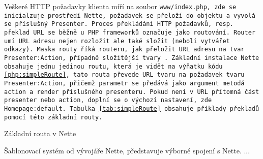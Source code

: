  \label{section:routovani}
Veškeré HTTP požadavky klienta míří na soubor \tt{www/index.php}, zde se inicialzuje prostředí Nette, požadavek se přeloží do objektu  a vyvolá se příslušný Presenter. Proces překládání HTTP požadavků, resp. překlad URL se běžně u PHP frameworků označuje jako routování. Router umí URL adresu nejen rozložit ale také složit (neboli vytvářet odkazy). Maska routy říká routeru, jak přeložit URL adresu na tvar \texttt{Presenter:Action}, případně složitější tvary . Základní instalace Nette obsahuje jednu jedinou routu, která je vidět na výňatku kódu \ref{php:simpleRoute}, tato routa převede URL tvaru  na požadavek tvaru \texttt{Presenter:Action}, přičemž parametr  se předává jako argument metodá action a render příslušného presenteru. Pokud není v URL přítomná část presenter nebo action, doplní se o výchozí nastavení, zde \texttt{Homepage:default}. Tabulka \ref{tab:simpleRoute} obsahuje příklady překladů pomocí této základní routy.

\begin{listing}[ht]
\caption{Základní routa v Nette}
\label{php:simpleRoute}
\end{listing}


Šablonovací systém od vývojáře Nette, představuje výborné spojení s Nette. ...

